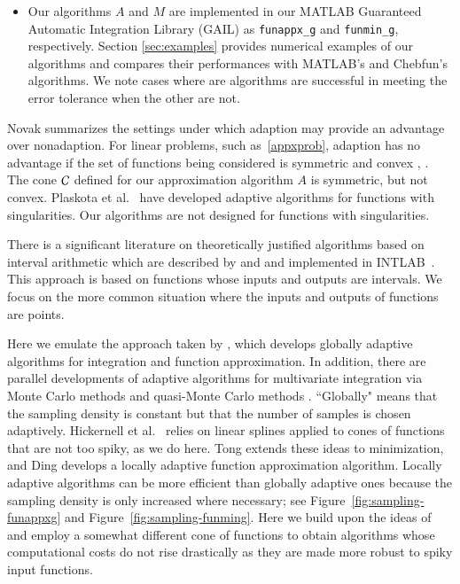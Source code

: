 \documentclass[review]{elsarticle}
\theoremstyle{definition}
\newcommand{\funappxg}{\texttt{funappx\_g}\xspace}
\newcommand{\funming}{\texttt{funmin\_g\xspace}}
\begin{document}
\begin{itemize}
\item Our algorithms $A$ and $M$ are implemented in our MATLAB Guaranteed Automatic Integration Library (GAIL) \cite{ChoEtal15a}  as \funappxg and \funming, respectively.   Section \ref{sec:examples} provides numerical examples of our algorithms and compares their performances with MATLAB's  and Chebfun's algorithms.  We note cases where are algorithms are successful in meeting the error tolerance when the other are not.

\end{itemize}

Novak \cite{Nov96a} summarizes the settings under which adaption may provide an advantage over nonadaption.  For linear problems, such as~\eqref{appxprob}, adaption has no advantage if the set of functions being considered is symmetric and convex  \cite[Theorem 1]{Nov96a}, \cite[Chapter 4, Theorem 5.2.1]{TraWasWoz88}.  The cone $\mathcal{C}$ defined for our approximation algorithm $A$ is symmetric, but not convex.  Plaskota et al.~\cite{PlaEtal08a} have developed adaptive algorithms for functions with singularities.  Our algorithms are not designed for functions with singularities.

There is a significant literature on theoretically justified algorithms based on interval arithmetic which are described by \cite{MoKeCl09} and \cite{Rum10a} and implemented in INTLAB~\cite{Rum99a}.  This approach is based on functions whose inputs and outputs are intervals.  We focus on the more common situation where the inputs and outputs of functions are points.

Here we emulate the approach taken by \cite{HicEtal14b}, which develops globally adaptive algorithms for integration and function approximation.  In addition, there are  parallel developments of adaptive algorithms for multivariate integration via Monte Carlo methods \citep{HicEtal14a, Jia16a} and quasi-Monte Carlo methods \citep{HicJim16a,JimHic16a}.  ``Globally" means that the sampling density is constant but that the number of samples is chosen adaptively.  Hickernell et al.~\cite{HicEtal14b} relies on linear splines applied to cones of functions that are not too spiky, as we do here.  Tong \cite{Ton14a} extends these ideas to minimization, and Ding \cite{Din15a} develops a locally adaptive function approximation algorithm.  Locally adaptive algorithms can be more efficient than globally adaptive ones because the sampling density is only increased where necessary; see Figure~\ref{fig:sampling-funappxg} and Figure~\ref{fig:sampling-funming}. Here we build upon the ideas of \cite{Din15a} and employ a somewhat different cone of functions to obtain algorithms whose computational costs do not rise drastically as they are made more robust to spiky input functions.
\end{document}
